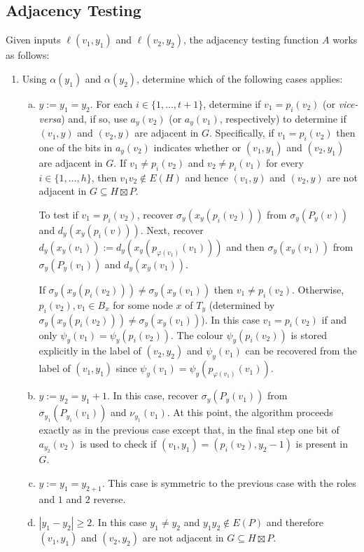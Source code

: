 \documentclass{patmorin}
\begin{document}
\subsection{Adjacency Testing}

Given inputs $\ell(v_1,y_1)$ and $\ell(v_2,y_2)$, the adjacency testing function $A$ works as follows:
\begin{enumerate}
    \item Using $\alpha(y_1)$ and $\alpha(y_2)$, determine which of the following cases applies:
    \begin{enumerate}[(a)]
        \item $y:=y_1=y_2$.  For each $i\in\{1,\ldots,t+1\}$, determine if $v_1=p_i(v_2)$ (or \textit{vice-versa}) and, if so, use $a_y(v_2)$ (or $a_y(v_1)$, respectively) to determine if $(v_1,y)$ and $(v_2,y)$ are adjacent in $G$. Specifically, if $v_1=p_i(v_2)$ then one of the bits in $a_y(v_2)$ indicates whether or $(v_1,y_1)$ and $(v_2,y_1)$ are adjacent in $G$. If $v_1\neq p_i(v_2)$ and $v_2\neq p_i(v_1)$ for every $i\in\{1,\ldots,h\}$, then $v_1v_2\not\in E(H)$ and hence $(v_1,y)$ and $(v_2,y)$ are not adjacent in $G\subseteq H\boxtimes P$.

        To test if $v_1=p_i(v_2)$, recover $\sigma_y(x_y(p_i(v_2)))$ from $\sigma_y(P_y(v))$ and $d_y(x_y(p_i(v)))$.  Next, recover $d_y(x_y(v_1)):=d_y(x_y(p_{\varphi(v_1)}(v_1)))$ and then  $\sigma_y(x_y(v_1))$ from $\sigma_y(P_y(v_1))$ and $d_y(x_y(v_1))$.

        If $\sigma_y(x_y(p_i(v_2))) \neq \sigma_y(x_y(v_1))$ then $v_1\neq p_i(v_2)$.  Otherwise, $p_i(v_2), v_1 \in B_x$ for some node $x$ of $T_y$ (determined by $\sigma_y(x_y(p_i(v_2))) \neq \sigma_y(x_y(v_1))$).  In this case $v_1=p_i(v_2)$ if and only $\psi_y(v_1)=\psi_y(p_i(v_2))$.  The colour $\psi_y(p_i(v_2))$ is stored explicitly in the label of $(v_2,y_2)$ and $\psi_y(v_1)$ can be recovered from the label of $(v_1,y_1)$ since $\psi_y(v_1)=\psi_y(p_{\varphi(v_1)}(v_1))$.

        \item $y:=y_2=y_1+1$.  In this case, recover $\sigma_y(P_y(v_1))$ from $\sigma_{y_1}(P_{y_1}(v_1))$ and $\nu_{y_1}(v_1)$.  At this point, the algorithm proceeds exactly as in the previous case except that, in the final step one bit of $a_{y_2}(v_2)$ is used to check if $(v_1,y_1)=(p_i(v_2),y_2-1)$ is present in $G$.

        \item $y:=y_1=y_{2+1}$. This case is symmetric to the previous case with the roles and $1$ and $2$ reverse.

        \item $|y_1-y_2|\ge 2$.  In this case $y_1\neq y_2$ and $y_1y_2\not\in E(P)$ and therefore $(v_1,y_1)$ and $(v_2,y_2)$ are not adjacent in $G\subseteq H\boxtimes P$.
    \end{enumerate}
\end{enumerate}
\end{document}
